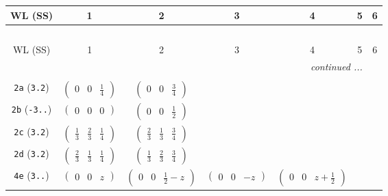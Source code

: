 \documentclass[fleqn,9pt,landscape]{jsarticle}
\begin{document}
\begin{center}
\renewcommand{\arraystretch}{1.2}
\begin{longtable}{ccccccc}
 \hline \hline
WL (SS) & 1 & 2 & 3 & 4 & 5 & 6 \\ \hline \endfirsthead

\multicolumn{6}{l}{\tablename\ \thetable{}} \\
 \hline \hline
WL (SS) & 1 & 2 & 3 & 4 & 5 & 6 \\ \hline \endhead

 \hline \hline
\multicolumn{6}{r}{\footnotesize\it continued ...} \\ \endfoot

 \hline \hline
\multicolumn{6}{r}{} \\ \endlastfoot

{\tt 2a} ({\tt 3.2}) & $ \begin{pmatrix} 0 & 0 & \frac{1}{4} \end{pmatrix} $ & $ \begin{pmatrix} 0 & 0 & \frac{3}{4} \end{pmatrix} $ & $  $ & $  $ & $  $ & $  $ \\ \hline
{\tt 2b} ({\tt -3..}) & $ \begin{pmatrix} 0 & 0 & 0 \end{pmatrix} $ & $ \begin{pmatrix} 0 & 0 & \frac{1}{2} \end{pmatrix} $ & $  $ & $  $ & $  $ & $  $ \\ \hline
{\tt 2c} ({\tt 3.2}) & $ \begin{pmatrix} \frac{1}{3} & \frac{2}{3} & \frac{1}{4} \end{pmatrix} $ & $ \begin{pmatrix} \frac{2}{3} & \frac{1}{3} & \frac{3}{4} \end{pmatrix} $ & $  $ & $  $ & $  $ & $  $ \\ \hline
{\tt 2d} ({\tt 3.2}) & $ \begin{pmatrix} \frac{2}{3} & \frac{1}{3} & \frac{1}{4} \end{pmatrix} $ & $ \begin{pmatrix} \frac{1}{3} & \frac{2}{3} & \frac{3}{4} \end{pmatrix} $ & $  $ & $  $ & $  $ & $  $ \\ \hline
{\tt 4e} ({\tt 3..}) & $ \begin{pmatrix} 0 & 0 & z \end{pmatrix} $ & $ \begin{pmatrix} 0 & 0 & \frac{1}{2} - z \end{pmatrix} $ & $ \begin{pmatrix} 0 & 0 & - z \end{pmatrix} $ & $ \begin{pmatrix} 0 & 0 & z + \frac{1}{2} \end{pmatrix} $ & $  $ & $  $ \\ \hline

\end{longtable}
\end{center}
\end{document}
